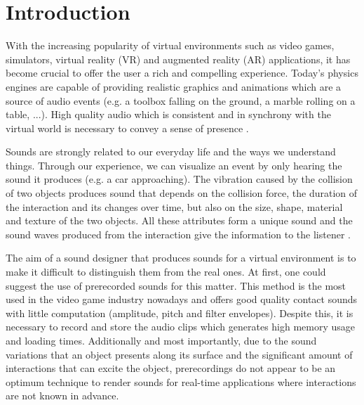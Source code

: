 \chapter{Introduction}

With the increasing popularity of virtual environments such as video games, simulators, virtual reality (VR) and augmented reality (AR) applications, it has become crucial to offer the user a rich and compelling experience. Today's physics engines are capable of providing realistic graphics and animations which are a source of audio events (e.g. a toolbox falling on the ground, a marble rolling on a table, ...). High quality audio which is consistent and in synchrony with the virtual world is necessary to convey a sense of presence \cite{larsson2002better}. 

Sounds are strongly related to our everyday life and the ways we understand things. Through our experience, we can visualize an event by only hearing the sound it produces (e.g. a car approaching). The vibration caused by the collision of two objects produces sound that depends on the collision force, the duration of the interaction and its changes over time, but also on the size, shape, material and texture of the two objects. All these attributes form a unique sound and the sound waves produced from the interaction give the information to the listener \cite{gaver1993world}.

The aim of a sound designer that produces sounds for a virtual environment is to make it difficult to distinguish them from the real ones. At first, one could suggest the use of prerecorded sounds for this matter. This method is the most used in the video game industry nowadays and offers good quality contact sounds with little computation (amplitude, pitch and filter envelopes). Despite this, it is necessary to record and store the audio clips which generates high memory usage and loading times. Additionally and most importantly, due to the sound variations that an object presents along its surface and the significant amount of interactions that can excite the object, prerecordings do not appear to be an optimum technique to render sounds for real-time applications where interactions are not known in advance\cite{verron2010synthese, van2001foleyautomatic}. 

